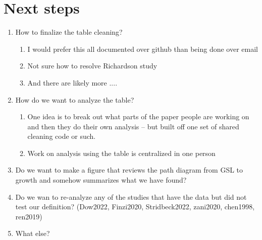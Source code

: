 \documentclass[11pt]{article}
\begin{document}
\section{Next steps}
\begin{enumerate}
\item How to finalize the table cleaning?
\begin{enumerate}
\item I would prefer this all documented over github than being done over email
\item Not sure how to resolve Richardson study
\item And there are likely more ....
\end{enumerate}
\item How do we want to analyze the table?
\begin{enumerate}
\item One idea is to break out what parts of the paper people are working on and then they do their own analysis -- but built off one set of shared cleaning code or such.
\item Work on analysis using the table is centralized in one person
\end{enumerate}
\item Do we want to make a figure that reviews the path diagram from GSL to growth and somehow summarizes what we have found?
\item Do we wan to re-analyze any of the studies that have the data but did not test our definition? (Dow2022, Finzi2020, Stridbeck2022, zani2020, chen1998, ren2019)
\item What else?
\end{enumerate}
\end{document}
